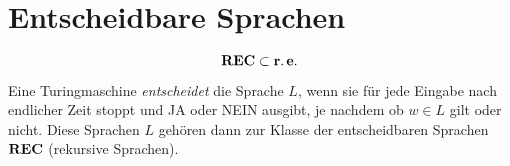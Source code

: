 \chapter{Entscheidbare Sprachen}\label{sec:rec}
\begin{equation*}
	\operatorname{\mathbf{REC}}\subset\operatorname{\mathbf{r.e.}}
\end{equation*}

Eine Turingmaschine \emph{entscheidet} die Sprache $L$, wenn sie für jede Eingabe nach endlicher Zeit stoppt und JA oder NEIN ausgibt, je nachdem ob $w\in L$ gilt oder nicht.
Diese Sprachen $L$ gehören dann zur Klasse der entscheidbaren Sprachen $\operatorname{\mathbf{REC}}$ (rekursive Sprachen).
